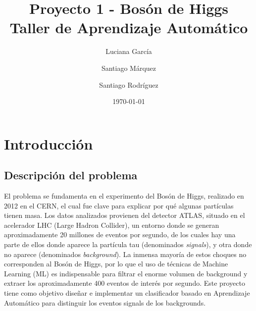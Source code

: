 \documentclass{article}
\title{\textbf{Proyecto 1 - Bosón de Higgs}\\Taller de Aprendizaje Automático}
\author{Luciana García  \and Santiago Márquez \and Santiago Rodríguez}
\date{\today}
\begin{document}
\maketitle


\section{Introducción}
\subsection{Descripción del problema}
El problema se fundamenta en el experimento del Bosón de Higgs, realizado en 2012 en el CERN, el cual fue clave para explicar por qué algunas partículas tienen masa. Los datos analizados provienen del detector ATLAS, situado en el acelerador LHC (Large Hadron Collider), un entorno donde se generan aproximadamente 20 millones de eventos por segundo, de los cuales hay una parte de ellos donde aparece la partícula tau (denominados  \textit{signals}), y otra donde no aparece (denominados \textit{background}).
La inmensa mayoría de estos choques no corresponden al Bosón de Higgs, por lo que el uso de técnicas de Machine Learning (ML) es indispensable para filtrar el enorme volumen de background y extraer los aproximadamente 400 eventos de interés por segundo. Este proyecto tiene como objetivo diseñar e implementar un clasificador basado en Aprendizaje Automático para distinguir los eventos signals de los backgrounds.
\end{document}
